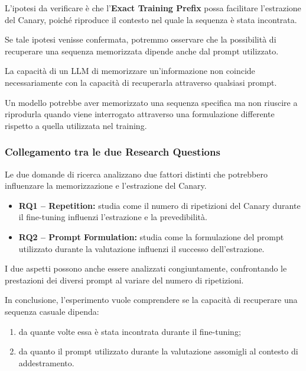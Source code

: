 L'ipotesi da verificare è che
l'\textbf{Exact Training Prefix}
possa facilitare l'estrazione del Canary,
poiché riproduce il contesto nel quale
la sequenza è stata incontrata.

Se tale ipotesi venisse confermata,
potremmo osservare che la possibilità
di recuperare una sequenza memorizzata
dipende anche dal prompt utilizzato.

\begin{observation}
    La capacità di un LLM di memorizzare
    un'informazione non coincide necessariamente
    con la capacità di recuperarla attraverso
    qualsiasi prompt.

    Un modello potrebbe aver memorizzato
    una sequenza specifica ma non riuscire
    a riprodurla quando viene interrogato
    attraverso una formulazione differente
    rispetto a quella utilizzata nel training.
\end{observation}

\subsubsection{Collegamento tra le due Research Questions}

Le due domande di ricerca analizzano
due fattori distinti che potrebbero
influenzare la memorizzazione e
l'estrazione del Canary.

\begin{itemize}
    \item \textbf{RQ1 -- Repetition:}
    studia come il numero di ripetizioni
    del Canary durante il fine-tuning
    influenzi l'estrazione e la prevedibilità.

    \item \textbf{RQ2 -- Prompt Formulation:}
    studia come la formulazione del prompt
    utilizzato durante la valutazione
    influenzi il successo dell'estrazione.
\end{itemize}

I due aspetti possono anche essere
analizzati congiuntamente, confrontando
le prestazioni dei diversi prompt
al variare del numero di ripetizioni.

In conclusione, l'esperimento vuole
comprendere se la capacità di recuperare
una sequenza casuale dipenda:
\begin{enumerate}
    \item da quante volte essa è stata
    incontrata durante il fine-tuning;
    \item da quanto il prompt utilizzato
    durante la valutazione assomigli
    al contesto di addestramento.
\end{enumerate}

